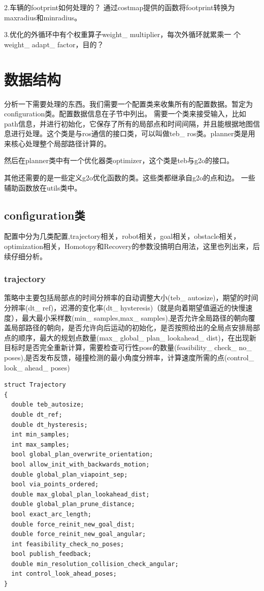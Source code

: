 \documentclass[10pt,a4paper]{article}
\theoremstyle{mythm}
\numberwithin{equation}{section}
\begin{document}
2.车辆的footprint如何处理的？
通过costmap提供的函数将footprint转换为maxradius和minradius。

3.优化的外循环中有个权重算子weight\_ multiplier，每次外循环就累乘一
个weight\_ adapt\_ factor，目的？


\section{数据结构}
分析一下需要处理的东西。我们需要一个配置类来收集所有的配置数据。暂定为configuration类。配置数据信息在子节中列出。
需要一个类来接受输入，比如path信息，并进行初始化，它保存了所有的局部点和时间间隔，并且能根据地图信息进行处理。这个类是与ros通信的接口类，可以叫做teb\_ ros类。planner类是用来核心处理整个局部路径计算的。

然后在planner类中有一个优化器类optimizer，这个类是teb与g2o的接口。

其他还需要的是一些定义g2o优化函数的类。这些类都继承自g2o的点和边。
一些辅助函数放在utils类中。
\subsection{configuration类}
配置中分为几类配置,trajectory相关，robot相关，goal相关，obstacle相关，optimization相关，Homotopy和Recovery的参数没搞明白用法，这里也列出来，后续仔细分析。
\subsubsection{trajectory}
策略中主要包括局部点的时间分辨率的自动调整大小(teb\_ autosize)，期望的时间分辨率(dt\_ ref)，迟滞的变化率(dt\_ hysteresis)（就是向着期望值逼近的快慢速度），最大最小采样数(min\_ samples,max\_ samples),是否允许全局路径的朝向覆盖局部路径的朝向，是否允许向后运动的初始化，是否按照给出的全局点安排局部点的顺序，最大的规划点数量(max\_ global\_ plan\_ lookahead\_ dist)，在出现新目标时是否完全重新计算，需要检查可行性pose的数量(feasibility\_ check\_ no\_ poses),是否发布反馈，碰撞检测的最小角度分辨率，计算速度所需的点(control\_ look\_ ahead\_ poses)
\begin{lstlisting}[caption={trajectory结构体}]
struct Trajectory
{
  double teb_autosize;
  double dt_ref;
  double dt_hysteresis;
  int min_samples;
  int max_samples;
  bool global_plan_overwrite_orientation;
  bool allow_init_with_backwards_motion;
  double global_plan_viapoint_sep;
  bool via_points_ordered;
  double max_global_plan_lookahead_dist;
  double global_plan_prune_distance;
  bool exact_arc_length;
  double force_reinit_new_goal_dist;
  double force_reinit_new_goal_angular;
  int feasibility_check_no_poses;
  bool publish_feedback;
  double min_resolution_collision_check_angular;
  int control_look_ahead_poses;
}
\end{lstlisting}
\end{document}
